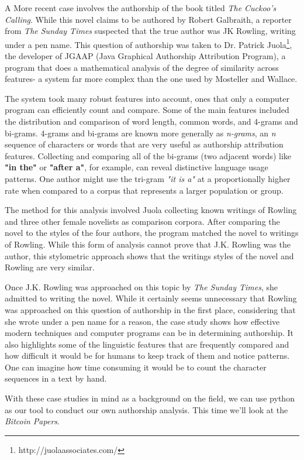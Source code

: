\documentclass{article}
\begin{document}
A More recent case involves the authorship of the book titled \textit{The Cuckoo's Calling}. While this novel claims to be authored by Robert Galbraith, a reporter from \textit{The Sunday Times} suspected that the true author was JK Rowling, writing under a pen name. This question of authorship was taken to Dr. Patrick Juola\footnote{http://juolaassociates.com/}, the developer of JGAAP (Java Graphical Authorship Attribution Program), a program that does a  mathematical analysis of the degree of similarity across features- a system far more complex than the one used by Mosteller and Wallace. 

The system took many robust features into account, ones that only a computer program can efficiently count and compare. Some of the main features included the distribution and comparison of word length, common words, and 4-grams and bi-grams. 4-grams and bi-grams are known more generally as \textit{n-grams}, an \textit{n} sequence of characters or words that are very useful as authorship attribution features. Collecting and comparing all of the bi-grams (two adjacent words) like \textbf{"in the"} or \textbf{"after a"}, for example, can reveal distinctive language usage patterns. One author might use the tri-gram \textit{"it is a"} at a proportionally higher rate when compared to a corpus that represents a larger population or group. 

The method for this analysis involved Juola collecting known writings of Rowling and three other female novelists as comparison corpora. After comparing the novel to the styles of the four authors, the program matched the novel to writings of Rowling. While this form of analysis cannot prove that J.K. Rowling was the author, this stylometric approach shows that the writings styles of the novel and Rowling are very similar. 

Once J.K. Rowling was approached on this topic by \textit{The Sunday Times}, she admitted to writing the novel. While it certainly seems unnecessary that Rowling was approached on this question of authorship in the first place, considering that she wrote under a pen name for a reason, the case study shows how effective modern techniques and computer programs can be in determining authorship. It also highlights some of the linguistic features that are frequently compared and how difficult it would be for humans to keep track of them and notice patterns. One can imagine how time consuming it would be to count the character sequences in a text by hand. 

With these case studies in mind as a background on the field, we can use python as our tool to conduct our own authorship analysis. This time we'll look at the \textit{Bitcoin Papers}. 
\end{document}
